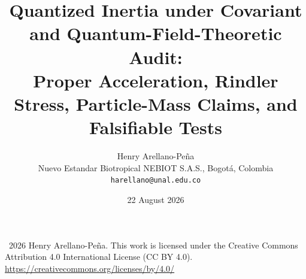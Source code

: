 \documentclass[11pt]{article}
\begin{document}
\title{\textbf{Quantized Inertia under Covariant and Quantum-Field-Theoretic Audit:}\\
Proper Acceleration, Rindler Stress, Particle-Mass Claims, and Falsifiable Tests}

\author{Henry Arellano-Pe\~na\\
Nuevo Estandar Biotropical NEBIOT S.A.S., Bogot\'a, Colombia\\
\texttt{harellano@unal.edu.co}}

\date{22 August 2026}
\maketitle

\begin{center}
\small
\textcopyright\ 2026 Henry Arellano-Pe\~na. This work is licensed under the Creative Commons Attribution 4.0 International License (CC BY 4.0).\\
\url{https://creativecommons.org/licenses/by/4.0/}
\end{center}
\end{document}

